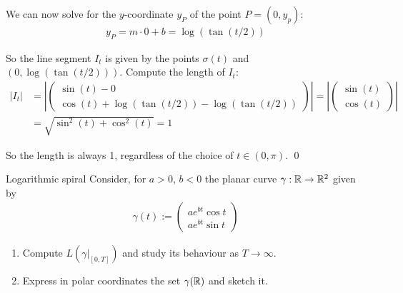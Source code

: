 \documentclass[12pt]{article}
\begin{document}
\begin{enumerate}
    We can now solve for the $y$-coordinate $y_P$ of the point $P = (0, y_p)$:
    \begin{align*}
        y_P = m \cdot 0 + b = \log(\tan(t/2))
    \end{align*}

    So the line segment $I_t$ is given by the points $\sigma(t)$ and $(0, \log(\tan(t/2)))$. Compute the length of $I_t$:
    \begin{align*}
        |I_t| &= 
        \left|\begin{pmatrix}
            \sin(t) - 0 \\
            \cos(t) + \log(\tan(t/2)) - \log(\tan(t/2))
        \end{pmatrix}\right|
        =
        \left|\begin{pmatrix}
            \sin(t) \\
            \cos(t)
        \end{pmatrix}\right| \\
        &= \sqrt{\sin^2(t) + \cos^2(t)} = 1
    \end{align*}

    So the length is always 1, regardless of the choice of $t \in (0, \pi)$. \qed
\end{enumerate}

\begin{problem}{Logarithmic spiral}{}
    Consider, for $a > 0$, $b < 0$ the planar curve $\gamma: \mathbb{R} \rightarrow \mathbb{R}^2$ given by
    \begin{align*}
        \gamma(t) :=
        \begin{pmatrix}
            ae^{bt}\cos t \\ ae^{bt}\sin t
        \end{pmatrix}
    \end{align*}

    \begin{enumerate}
        \item Compute $L(\gamma|_{[0, T]})$ and study its behaviour as $T \rightarrow \infty$.
        \item Express in polar coordinates the set $\gamma(\mathbb{R})$ and sketch it.
    \end{enumerate}
\end{problem}
\end{document}
